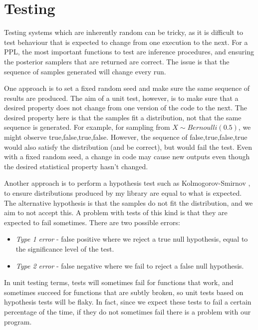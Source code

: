 	
\section{Testing}\label{sec:impl-testing}

Testing systems which are inherently random can be tricky, as it is difficult to test behaviour that is expected to change from one execution to the next. For a PPL, the most important functions to test are inference procedures, and ensuring the posterior samplers that are returned are correct. The issue is that the sequence of samples generated will change every run.

One approach is to set a fixed random seed and make sure the same sequence of results are produced. The aim of a unit test, however, is to make sure that a desired property does not change from one version of the code to the next. The desired property here is that the samples fit a distribution, not that the same sequence is generated. For example, for sampling from $X \sim Bernoulli(0.5)$, we might observe true,false,true,false. However, the sequence of false,true,false,true would also satisfy the distribution (and be correct), but would fail the test. Even with a fixed random seed, a change in code may cause new outputs even though the desired statistical property hasn't changed.

Another approach is to perform a hypothesis test such as Kolmogorov-Smirnov \cite{massey1951kolmogorov}, to ensure distributions produced by my library are equal to what is expected. The alternative hypothesis is that the samples do not fit the distribution, and we aim to not accept this. A problem with tests of this kind is that they are expected to fail sometimes. There are two possible errors:
\begin{itemize}
	\item \textit{Type 1 error} - false positive where we reject a true null hypothesis, equal to the significance level of the test.
	\item \textit{Type 2 error} - false negative where we fail to reject a false null hypothesis.
\end{itemize}
In unit testing terms, tests will sometimes fail for functions that work, and sometimes succeed for functions that are subtly broken, so unit tests based on hypothesis tests will be flaky. In fact, since we expect these tests to fail a certain percentage of the time, if they do not sometimes fail there is a problem with our program.


